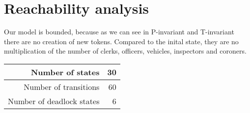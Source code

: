 \section{Reachability analysis}
\label{sec:Reachability analysis}
Our model is bounded, because as we can see in P-invariant and T-invariant there
 are no creation of new tokens. Compared to the inital state, they are no
 multiplication of the number of clerks, officers, vehicles, inspectors and
 coroners.


\begin{table}[h]
   \begin{tabular}{|r|r|}
       \hline
       Number of states & 30 \\
       \hline
       Number of transitions & 60 \\
       \hline
       Number of deadlock states & 6 \\
       \hline
   \end{tabular}
\end{table}
